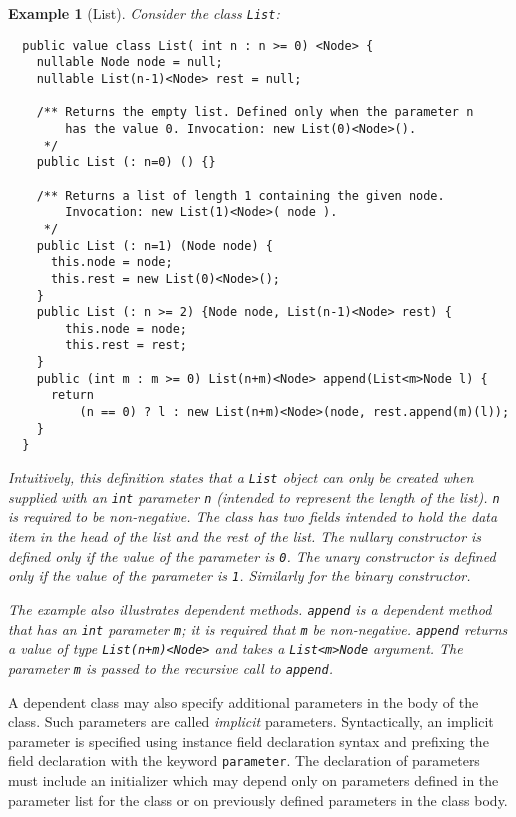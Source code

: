 \documentclass[fullpage]{article}
\newtheorem{example}{Example}[section]
\begin{document}
\begin{example}[List]\label{List}
Consider the class {\tt List}:
{\footnotesize
\begin{verbatim}
  public value class List( int n : n >= 0) <Node> {
    nullable Node node = null;
    nullable List(n-1)<Node> rest = null;

    /** Returns the empty list. Defined only when the parameter n 
        has the value 0. Invocation: new List(0)<Node>().
     */
    public List (: n=0) () {}

    /** Returns a list of length 1 containing the given node.
        Invocation: new List(1)<Node>( node ).
     */
    public List (: n=1) (Node node) {
      this.node = node;
      this.rest = new List(0)<Node>();
    }
    public List (: n >= 2) {Node node, List(n-1)<Node> rest) {
        this.node = node;
        this.rest = rest;
    }
    public (int m : m >= 0) List(n+m)<Node> append(List<m>Node l) {
      return 
          (n == 0) ? l : new List(n+m)<Node>(node, rest.append(m)(l));
    }
  }  
\end{verbatim}}
Intuitively, this definition states that a {\tt List} object can only
be created when supplied with an {\tt int} parameter {\tt n} (intended
to represent the length of the list). {\tt n} is required to be
non-negative. The class has two fields intended to hold the data item
in the head of the list and the rest of the list. The nullary
constructor is defined only if the value of the parameter is {\tt 0}.
The unary constructor is defined only if the value of the parameter is
{\tt 1}. Similarly for the binary constructor. 

The example also illustrates {\em dependent methods}. {\tt append} is
a dependent method that has an {\tt int} parameter {\tt m}; it is
required that {\tt m} be non-negative. {\tt append} returns a value of
type {\tt List(n+m)<Node>} and takes a {\tt List<m>Node} argument. The
parameter {\tt m} is passed to the recursive call to {\tt append}.

\end{example}

A dependent class may also specify additional parameters in the body
of the class. Such parameters are called {\em implicit} parameters.
Syntactically, an implicit parameter is specified using instance field
declaration syntax and prefixing the field declaration with the
keyword {\tt parameter}. The declaration of parameters must include an
initializer which may depend only on parameters defined in the
parameter list for the class or on previously defined parameters in
the class body.  
\end{document}
